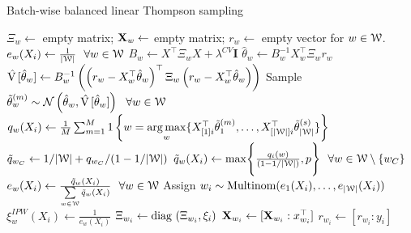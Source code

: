 \documentclass[letterpaper, 12pt, parskip=full,]{scrartcl}
\begin{document}
\begin{algorithm} \footnotesize
    \caption{Batch-wise balanced linear Thompson sampling}
    \label{algg:bblts}
    \begin{algorithmic}[1] %
    	\State$\Xi_w \leftarrow$ empty matrix; $\mathbf{X}_w \leftarrow$ empty matrix; $r_w \leftarrow$ empty vector for $w \in {\EuScript W}$. 
			 \State $e_{w}(X_i) \leftarrow \frac{1 }{|{\EuScript W}| } \ \ \forall w \in {\EuScript W} $ 
					\State $B_w \leftarrow X^\top \Xi_w X + \lambda^{CV} \mathbf{I}$ 
					\State $\hat\theta_{w} \leftarrow B_w^{-1} X_w^\top \Xi_w r_w$
					\State $\hat{{\textrm V}\,}[\hat\theta_{w}] \leftarrow B_w^{-1} \left(\left( r_w - X_w^\top\hat\theta_{w} \right)^\top \Xi_w \left( r_w - X_w^\top\hat\theta_{w} \right)\right)$
				\EndFor
			\EndIf
				\State Sample $\tilde \theta ^{(m)}_w \sim \mathcal{N}\left(\hat\theta_{w}, \hat\V[\hat\theta_{w}] \right) \ \   \forall w \in \ww$
			 \EndFor
				\State $q_w(X_i) \leftarrow \frac{1}{M} \sum_{m=1}^M 1\left\{ w = \underset{w}{\operatorname*{arg\,max}} \{ X_{[1]i}^\top \tilde \theta ^{(m)}_1, \dots, X_{[|{\EuScript W}|]i}^\top\tilde \theta_{|{\EuScript W}|}^{(s)} \}  \right\}$ 
			\State $\tilde{q}_{w_C}  \leftarrow 1/|{\EuScript W}| + {q}_{w_C}/(1-1/|{\EuScript W}|) $ 
                         \State $ \tilde{q}_w(X_i)  \leftarrow\max\Biggr\{\frac{ q_{i}(w)}{(1-1/|{\EuScript W}|)} , p\Biggr\} \ \ \forall w \in {\EuScript W} \setminus \{w_C\}$ 
                          \State $e_{w}(X_i) \leftarrow \frac{ \tilde{q}_w(X_i)}{\sum\limits_{w \in {\EuScript W} }\tilde{q}_w(X_i) } \ \ \forall w \in {\EuScript W} $   
		\EndIf
		\State Assign $w_i \sim \textrm{Multinom}( e_{1}(X_i) , \dots,  e_{|{\EuScript W}|}(X_i) )$
		\State $\xi^{IPW}_w(X_i) \leftarrow \frac{ 1 }{e_{w}(X_i)}$ 
		\State $\Xi_{w_i} \leftarrow {\textrm {diag} }\, \left(\Xi_{w_i}, \xi_i\right)$ 
		\State $\mathbf{X}_{w_i} \leftarrow [\mathbf{X}_{w_i}:x_{w_i}^\top]$ 
		\State $r_{w_i} \leftarrow  [r_{w_i}: y_i]$ 

	\EndFor
    \end{algorithmic}
\end{algorithm}
\end{document}
